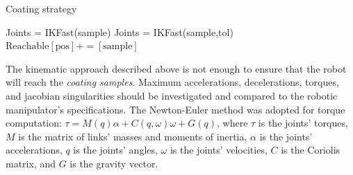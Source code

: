 \begin{figure}
	\centering
	\quad
\end{figure}

\begin{algorithm}
\caption{Coating strategy}
\label{alg:strategy}
\begin{algorithmic}[1]
			\State Joints = IKFast(sample)
				\State Joints = IKFast(sample,tol)
			\EndIf
				\State $\textrm{Reachable}[\textrm{pos}] += [\textrm{sample}]$
				\label{algvar:reachable}
			\EndIf
		\EndFor
\EndFor
\end{algorithmic}
\end{algorithm}

The kinematic approach described above is not enough to ensure that the robot
will reach the \textit{coating samples}. Maximum accelerations, decelerations,
torques, and jacobian singularities should be investigated and compared to the robotic
manipulator's specifications. The Newton-Euler method
\cite{sciavicco2000differential} was adopted for torque computation: $\tau =
M(q)\alpha + C(q,\omega)\omega + G(q)$, where $\tau$ is the joints' torques,
$M$ is the matrix of links' masses and moments of inertia, $\alpha$ is the
joints' accelerations, $q$ is the joints' angles, $\omega$ is the joints'
velocities, $C$ is the Coriolis matrix, and $G$ is the gravity vector.

